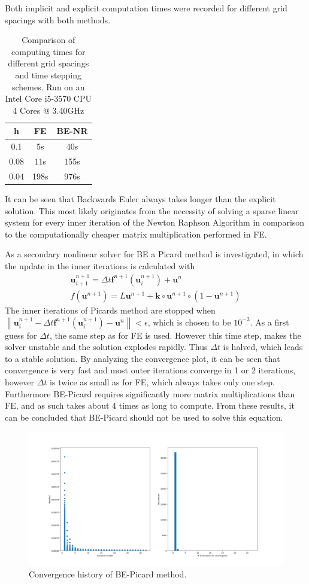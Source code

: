 \documentclass{article}
\newcommand{\norm}[1]{\left\lVert#1\right\rVert}
\begin{document}
Both implicit and explicit computation times were recorded for different grid spacings with both methods.
\begin{table}[H]
\centering
\begin{tabular}{c|c|c}
	h & FE & BE-NR \\\hline
	0.1 & 5s & 40s\\ \hline
	0.08 & 11s & 155s\\ \hline
	0.04 & 198s & 976s
\end{tabular}
\caption{Comparison of computing times for different grid spacings and time stepping schemes. Run on an Intel Core i5-3570 CPU  4 Cores @ 3.40GHz}
\end{table}
It can be seen that Backwards Euler always takes longer than the explicit solution. This most likely originates from the necessity of solving a sparse linear system for every inner iteration of the Newton Raphson Algorithm in comparison to the computationally cheaper matrix multiplication performed in FE. \par
As a secondary nonlinear solver for BE a Picard method is investigated, in which the update in the inner iterations is calculated with
\begin{align}
\mathbf{u}_{i+1}^{n+1}=\Delta t \mathbf{f}^{n+1}\left(\mathbf{u}_{i}^{n+1}\right)+\mathbf{u}^{n}\\
f(\mathbf{u}^{n+1})=L \mathbf{u}^{n+1} + \mathbf{k}\circ\mathbf{u}^{n+1}\circ\left(1-\mathbf{u}^{n+1}\right)
\end{align}
The inner iterations of Picards method are stopped when $\norm{\mathbf{u}_{i}^{n+1}-\Delta t \mathbf{f}^{n+1}\left(\mathbf{u}_{i}^{n+1}\right)-\mathbf{u}^{n}} < \epsilon$, which is chosen to be $10^{-3}$. As a first guess for $\Delta t$, the same step as for FE is used. However this time step, makes the solver unstable and the solution explodes rapidly. Thus $\Delta t$ is halved, which leads to a stable solution. By analyzing the convergence plot, it can be seen that convergence is very fast and most outer iterations converge in 1 or 2 iterations, however $\Delta t$ is twice as small as for FE, which always takes only one step. Furthermore BE-Picard requires significantly more matrix multiplications than FE, and as such takes about 4 times as long to compute. From these results, it can be concluded that BE-Picard should not be used to solve this equation.

\begin{figure}[H]
	\centering
	\includegraphics[width=.9\linewidth]{4ConvergencePicard.png}
	\caption{Convergence history of BE-Picard method.}
\end{figure}
\end{document}
